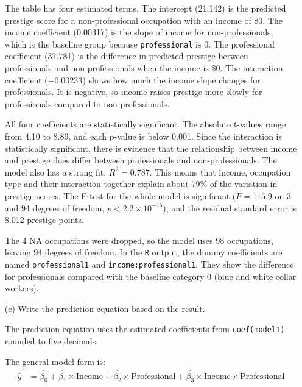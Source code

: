 \documentclass[12pt,letterpaper]{article}
\begin{document}
\begin{enumerate}
		\noindent The table has four estimated terms. The intercept (21.142) is the predicted prestige score for a non-professional occupation with an income of \$0. The income coefficient (0.00317) is the slope of income for non-professionals, which is the baseline group because \texttt{professional} is 0. The professional coefficient (37.781) is the difference in predicted prestige between professionals and non-professionals when the income is \$0. The interaction coefficient ($-0.00233$) shows how much the income slope changes for professionals. It is negative, so income raises prestige more slowly for professionals compared to non-professionals. 
		
		\vspace{.25cm}
		\noindent All four coefficients are statistically significant. The absolute t-values range from 4.10 to 8.89, and each p-value is below 0.001. Since the interaction is statistically significant, there is evidence that the relationship between income and prestige does differ between professionals and non-professionals. The model also has a strong fit: $R^2 = 0.787$. This means that income, occupation type and their interaction together explain about 79\% of the variation in prestige scores. The F-test for the whole model is significant ($F = 115.9$ on 3 and 94 degrees of freedom, $p < 2.2 \times 10^{-16}$), and the residual standard error is 8.012 prestige points.
		
		\vspace{.25cm}
		\noindent The 4 NA occupations were dropped, so the model uses 98 occupations, leaving 94 degrees of freedom. In the \texttt{R} output, the dummy coefficients are named \texttt{professional1} and \texttt{income:professional1}. They show the difference for professionals compared with the baseline category 0 (blue and white collar workers).  
		\vspace{.5cm}
		
		\item [(c)]
		Write the prediction equation based on the result.
		\vspace{.25cm}
		
		\noindent The prediction equation uses the estimated coefficients from \texttt{coef(model1)} rounded to five decimals.
		
		
		
		\vspace{.25cm}
		\noindent The general model form is:
		\begin{align*}
			\hat{y} &= \hat{\beta_0} + \hat{\beta_1} \times \text{Income} + \hat{\beta_2} \times \text{Professional} + \hat{\beta_3} \times \text{Income} \times \text{Professional}
		\end{align*}
		

\end{enumerate}
\end{document}
